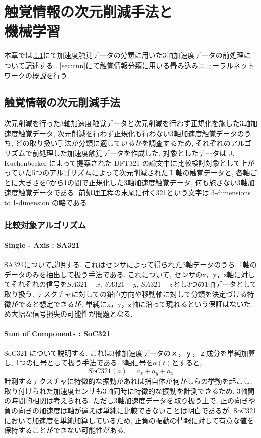 
\chapter{触覚情報の次元削減手法と\\機械学習}
\label{chap:method}
本章では,\ref{sec:prepro}にて加速度触覚データの分類に用いた3軸加速度データの前処理について記述する . \ref{sec:cnn}にて触覚情報分類に用いる畳み込みニューラルネットワークの概説を行う. 
\section{触覚情報の次元削減手法}
\label{sec:prepro}
次元削減を行った3軸加速度触覚データと次元削減を行わず正規化を施した3軸加速度触覚データ, 次元削減を行わず正規化も行わない3軸加速度触覚データのうち, どの取り扱い手法が分類に適しているかを調査するため, それぞれのアルゴリズムで前処理した加速度触覚データを作成した. 
対象としたデータは J. Kuchenbecker によって提案された DFT321 \cite{dft321} の論文中に比較検討対象として上がっていた5つのアルゴリズムによって次元削減された１軸の触覚データと, 各軸ごとに大きさを0から1の間で正規化した3軸加速度触覚データ, 何も施さない3軸加速度触覚データである. 前処理工程の末尾に付く321という文字は 3-dimensions to 1-dimension の略である. 
\subsection{比較対象アルゴリズム}
\subsubsection{Single - Axis : SA321}
SA321について説明する. これはセンサによって得られた3軸データのうち, 1軸のデータのみを抽出して扱う手法である. 
これについて, センサのx，y，z軸に対してそれぞれの信号を$SA321-x$, $SA321-y$, $SA321-z$とし3つの1軸データとして取り扱う.  
テスクチャに対しての鉛直方向や移動軸に対して分類を決定づける特徴がでると想定できるが, 単純にx，y，z軸に沿って現れるという保証はないため大幅な信号損失の可能性が問題となる.  

\subsubsection{Sum of Components : SoC321}
SoC321 について説明する. これは3軸加速度データの$ｘ$，$ｙ$，$ｚ$成分を単純加算し, 1つの信号として扱う手法である. 3軸信号を$a(t)$とすると, 
\begin{equation}
SoC321(a)=a_{x}+a_{y}+a_{z} 
\end{equation}
計測するテクスチャに特徴的な振動があれば指自体が何かしらの挙動を起こし, 取り付けられた加速度センサも3軸同時に特徴的な振動を計測できるため, 3軸間の時間的相関は考えられる. 
ただし3軸加速度データを取り扱う上で, 正の向きや負の向きの加速度は軸が違えば単純に比較できないことは明白であるが, SoC321 において加速度を単純加算しているため, 正負の振動の情報に対して有意な値を保持することができない可能性がある. 

